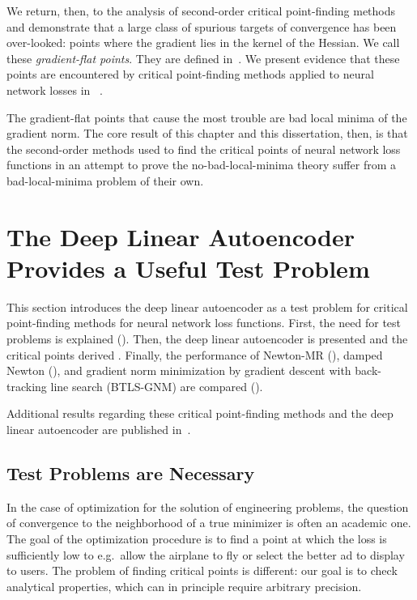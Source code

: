 \documentclass[../../thesis.tex]{subfiles}
\begin{document}
We return, then, to the analysis of second-order
critical point-finding methods and demonstrate
that a large class of spurious targets of convergence
has been over-looked:
points where the gradient lies in the kernel of the Hessian.
We call these \emph{gradient-flat points}.
They are defined in~.
We present evidence that these points are encountered
by critical point-finding methods applied to neural network losses in%
~.

The gradient-flat points that cause the most trouble are
bad local minima of the gradient norm.
The core result of this chapter
and this dissertation, then,
is that the second-order methods
used to find the critical points
of neural network loss functions
in an attempt to prove the no-bad-local-minima theory
suffer from a bad-local-minima problem of their own.

\section{The Deep Linear Autoencoder Provides a Useful Test Problem}%

This section introduces the deep linear autoencoder
as a test problem for critical point-finding methods
for neural network loss functions.
First,
the need for test problems is explained
().
Then,
the deep linear autoencoder is presented
and the critical points derived
.
Finally, the performance of
Newton-MR (),
damped Newton (),
and gradient norm minimization by
gradient descent with back-tracking line search
(BTLS-GNM)
are compared
().

Additional results regarding these critical point-finding methods
and the deep linear autoencoder are
published in~\cite{frye2019}.

\subsection{Test Problems are Necessary}%

In the case of optimization for the solution of engineering problems,
the question of convergence to the neighborhood of a true minimizer
is often an academic one.
The goal of the optimization procedure is to find a point
at which the loss is sufficiently low to
e.g.~allow the airplane to fly
or select the better ad to display to users.
The problem of finding critical points is different:
our goal is to check analytical properties,
which can in principle require arbitrary precision.
\end{document}
